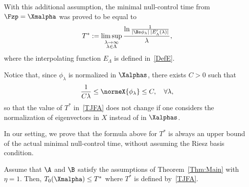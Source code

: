 \begingroup
With this additional assumption, the minimal null-control time from $\Fzp=\Xmalpha$ was proved to be equal to
\begin{equation}\label{TJFA}
T^*:=\limsup_{\substack{\lambda\to \infty\\ \lambda\in \Lambda}} \frac{\ln \frac{1}{| \Bs\phi_\lambda | \: | E_\Lambda' (\lambda) |}}{ \lambda },
\end{equation}
where the interpolating function $E_\Lambda$ is defined in~\eqref{DefE}.
\endgroup

\begin{rema}
Notice that, since $\phi_\lambda$ is normalized in $\Xalphas$, there exists $C>0$ such that
\[
\frac{1}{C \lambda} \leq \normeX{\phi_\lambda} \leq C, \quad \forall \lambda,
\]
so that the value of $T^*$ in~\eqref{TJFA} does not change if one considers the normalization of eigenvectors in $X$ instead of in $\Xalphas$.
\end{rema}

In our setting, we prove that the formula above for $T^*$ is always an upper bound of the actual minimal null-control time, without assuming the Riesz basis condition.

\begin{prop}\label{Prop:T_0<T*}
Assume that $\A$ and $\B$ satisfy the assumptions of Theorem~\ref{Thm:Main} with $\eta=1$. Then, $T_0(\Xmalpha) \leq T^*$ where $T^*$ is defined by~\eqref{TJFA}.
\end{prop}


